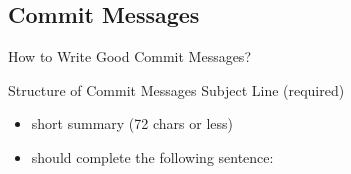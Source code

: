 \subsection{Commit Messages}

\begin{frame}{How to Write Good Commit Messages?}
	\begin{fancycolumns}
		\begin{definition}{Structure of Commit Messages }
			Subject Line (required)
			\vspace{-1mm}
			\begin{itemize}
				\item short summary (72 chars or less)
				\item should complete the following sentence:\\
			\end{itemize}
			

\end{definition}
\end{fancycolumns}
\end{frame}
